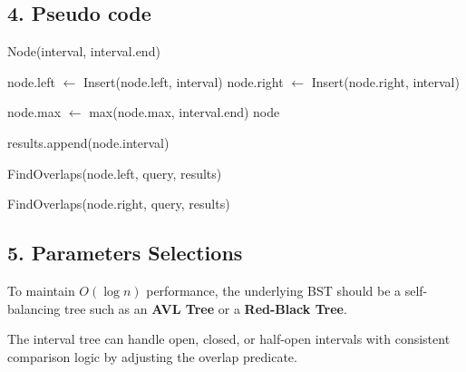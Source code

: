 \subsection{4. Pseudo code}
\begin{algorithm}
\begin{algorithmic}[1]
\label{alg:it_insert}
        \State \Return Node(interval, interval.end)
    \EndIf
        
        \State node.left $\gets$ Insert(node.left, interval)
    \Else
        \State node.right $\gets$ Insert(node.right, interval)
    \EndIf
        
    \State node.max $\gets$ max(node.max, interval.end)
    \State \Return node
\EndFunction

\label{alg:it_find}
        \State \Return
    \EndIf
        
        \State results.append(node.interval)
    \EndIf
        
        \State FindOverlaps(node.left, query, results)
    \EndIf
        
        \State FindOverlaps(node.right, query, results)
    \EndIf
\EndFunction
\end{algorithmic}
\end{algorithm}

\subsection{5. Parameters Selections}
\begin{definition}
\label{def:it_balancing}
To maintain $O(\log n)$ performance, the underlying BST should be a self-balancing tree such as an \textbf{AVL Tree} or a \textbf{Red-Black Tree}.
\end{definition}

\begin{definition}
\label{def:it_interval_type}
The interval tree can handle open, closed, or half-open intervals with consistent comparison logic by adjusting the overlap predicate.
\end{definition}

